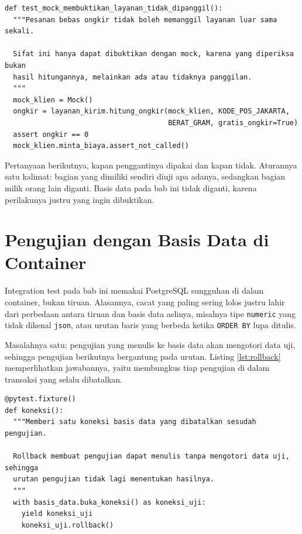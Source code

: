 \begin{lstlisting}[style=PythonStyle, caption={Mock membuktikan panggilan yang tidak terjadi, tersedia di \berkas{sources/chapter06/test\_double.py}}, label={lst:double}]
def test_mock_membuktikan_layanan_tidak_dipanggil():
  """Pesanan bebas ongkir tidak boleh memanggil layanan luar sama sekali.

  Sifat ini hanya dapat dibuktikan dengan mock, karena yang diperiksa bukan
  hasil hitungannya, melainkan ada atau tidaknya panggilan.
  """
  mock_klien = Mock()
  ongkir = layanan_kirim.hitung_ongkir(mock_klien, KODE_POS_JAKARTA,
                                       BERAT_GRAM, gratis_ongkir=True)
  assert ongkir == 0
  mock_klien.minta_biaya.assert_not_called()
\end{lstlisting}

Pertanyaan berikutnya, kapan penggantinya dipakai dan kapan tidak. Aturannya
satu kalimat: bagian yang dimiliki sendiri diuji apa adanya, sedangkan bagian
milik orang lain diganti. Basis data pada bab ini tidak diganti, karena
perilakunya justru yang ingin dibuktikan.

\section{Pengujian dengan Basis Data di Container}

Integration test pada bab ini memakai PostgreSQL sungguhan di dalam
container, bukan tiruan. Alasannya, cacat yang paling sering lolos justru
lahir dari perbedaan antara tiruan dan basis data aslinya, misalnya tipe
\texttt{numeric} yang tidak dikenal \texttt{json}, atau urutan baris yang
berbeda ketika \texttt{ORDER BY} lupa ditulis.

Masalahnya satu: pengujian yang menulis ke basis data akan mengotori data
uji, sehingga pengujian berikutnya bergantung pada urutan. Listing
\ref{lst:rollback} memperlihatkan jawabannya, yaitu membungkus tiap pengujian
di dalam transaksi yang selalu dibatalkan.

\begin{lstlisting}[style=PythonStyle, caption={Fixture yang mengembalikan basis data ke keadaan semula, tersedia di \berkas{sources/chapter06/conftest.py}}, label={lst:rollback}]
@pytest.fixture()
def koneksi():
  """Memberi satu koneksi basis data yang dibatalkan sesudah pengujian.

  Rollback membuat pengujian dapat menulis tanpa mengotori data uji, sehingga
  urutan pengujian tidak lagi menentukan hasilnya.
  """
  with basis_data.buka_koneksi() as koneksi_uji:
    yield koneksi_uji
    koneksi_uji.rollback()
\end{lstlisting}

